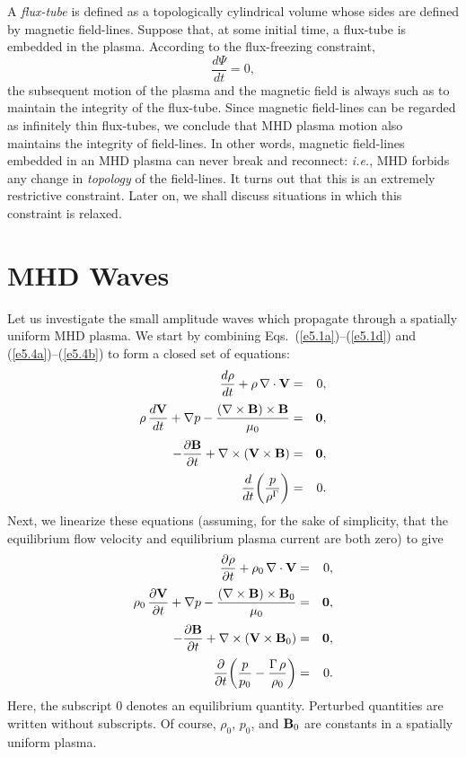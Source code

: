 A {\em flux-tube}\/ is defined as a topologically   cylindrical volume whose
sides are defined by magnetic field-lines. Suppose that, at some initial
time, a flux-tube is embedded in the plasma. According to the flux-freezing
constraint,
\begin{equation}
\frac{d{\Psi}}{dt} = 0,
\end{equation}
the subsequent motion of the plasma and the magnetic field is always
such as to maintain the integrity of the flux-tube. Since magnetic
field-lines can be regarded as infinitely thin flux-tubes, we conclude that
MHD  plasma motion also maintains the integrity of field-lines. In other words,
magnetic field-lines embedded in an MHD plasma can never break and reconnect:
{\em i.e.}, MHD forbids any change in {\em topology}\/ of the field-lines. It turns
out that this is an extremely restrictive constraint. Later on, we shall discuss
situations in which this constraint is  relaxed. 

\section{MHD Waves}\label{s5.4}
Let us investigate the small amplitude waves which  propagate through
a spatially uniform MHD plasma. We start by combining Eqs.~(\ref{e5.1a})--(\ref{e5.1d}) and (\ref{e5.4a})--(\ref{e5.4b}) to form a
closed set of equations:
\begin{eqnarray}
\frac{d\rho}{dt} + \rho\,\nabla\cdot{\bf V} &=& 0,\\[0.5ex]
\rho\,\frac{d{\bf V}}{dt} + \nabla p - \frac{(\nabla\times{\bf B})\times {\bf B}}{\mu_0} &=& {\bf 0},\\[0.5ex]
-\frac{\partial{\bf B}}{\partial t}+ \nabla\times(
{\bf V} \times {\bf B}) &=& {\bf 0},\\[0.5ex]
\frac{d}{dt}\!\left(\frac{p}{\rho^{\Gamma}}\right) &=& 0.
\end{eqnarray}
Next, we linearize these equations (assuming, for the sake of
simplicity, that the equilibrium
flow velocity and equilibrium plasma current are both zero) to give
\begin{eqnarray}\label{e5.19a}
\frac{\partial\rho}{\partial t} + \rho_0\,\nabla\cdot{\bf V} &=& 0,\\[0.5ex]
\rho_0\,\frac{\partial {\bf V}}{\partial t} + \nabla p - 
\frac{(\nabla\times{\bf B})\times {\bf B}_0}{\mu_0} &=& {\bf 0},\\[0.5ex]
-\frac{\partial{\bf B}}{\partial t}+ \nabla\times(
{\bf V} \times {\bf B}_0) &=& {\bf 0},\\[0.5ex]
\frac{\partial}{\partial t}\!\left(\frac{p}{p_0} - \frac{{\Gamma}\,\rho}{\rho_0}\right) &=& 0.\label{e5.19d}
\end{eqnarray}
Here, the subscript 0 denotes an equilibrium quantity. Perturbed quantities
are written without subscripts. Of course, $\rho_0$, $p_0$,  and ${\bf B}_0$ are 
constants in a spatially uniform plasma. 

